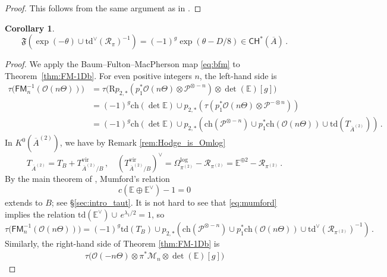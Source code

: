 \documentclass[11pt]{article}
\def\Mc{\mathcal{M}}
\def\CH{\mathsf{CH}}
\def\CO{\mathcal{O}}
\def\P{\mathcal{P}}
\def\EE{\mathbb{E}}
\def\vir{\mathrm{vir}}
\def\ch{\mathrm{ch}}
\def\Td{\mathrm{td}}
\def\fm{\mathfrak{F}}
\def\cR{\mathcal{R}}
\def\FM{\mathsf{FM}}
\renewcommand{\log}{\mathrm{log}}
\newcommand{\barA}{\overline{A}}
\theoremstyle{definition}
\newtheorem{corollary}[definition]{Corollary}
\begin{document}
\begin{proof}
    This follows from the same argument as in \cite[\S 4]{BMP}.
\end{proof}

\begin{corollary}\label{cor:F(exp_theta)}
    \begin{equation}\label{eq:Ftheta}
        \fm(\exp(-\theta) \cup \Td^\vee(\cR_\pi)^{-1}) = (-1)^g\exp(\theta- D/8)\in \CH^{\ast}(\barA)\,.
    \end{equation}
\end{corollary}

\begin{proof}
    We apply the Baum--Fulton--MacPherson map \eqref{eq:bfm} to Theorem~\ref{thm:FM-1Db}. For even positive integers $n$, the left-hand side is
    \begin{align*}
    \tau\big(\FM^{-1}_n(\CO(n\Theta))\big)
    &= \tau\big(\mathrm{R}p_{2,*}(p_1^*\CO(n\Theta) \otimes \P^{\otimes -n})\otimes \det(\mathbb E)[g]\big) \\
    &= (-1)^g\ch(\det\mathbb E) \cup p_{2,*}\!\left(\tau(p_1^*\CO(n\Theta) \otimes \P^{-\otimes n})\right) \\
    &= (-1)^g\ch (\det \mathbb E)\cup p_{2,*}\!\left(\ch(\P^{\otimes- n})\cup p_1^*\ch(\CO(n\Theta))\cup \Td(T_{\barA^{(2)}})\right)\,.
    \end{align*}
    In $K^0(\barA^{(2)})$, we have by Remark \ref{rem:Hodge_is_Omlog}
    $$
    T_{\barA^{(2)}} = T_B + T_{\barA^{(2)}/B}^{\vir}\, ,\quad (T^{\vir}_{\barA^{(2)}/B})^\vee = \Omega_{\pi^{(2)}}^{\log} - \cR_{\pi^{(2)}} = \mathbb E^{\oplus 2} - \cR_{\pi^{(2)}}\, .
    $$
	By the main theorem of \cite{EV04}, Mumford's relation
    \begin{equation}\label{eq:mumford}
        c(\EE \oplus \EE^\vee)-1=0
    \end{equation}
    extends to $B$; see \S\ref{sec:intro_taut}.
    It is not hard to see that \eqref{eq:mumford} implies the relation $\Td(\EE^\vee)\cup \,e^{\lambda_1/2} = 1$, so
    \begin{equation}\label{eq:simplifytau}
    \tau\big(\FM_n^{-1}(\mathcal O(n\Theta))\big) = (-1)^g\Td(T_B) \cup p_{2,*}\!\left(\ch(\P^{\otimes- n})\cup p_1^*\ch(\CO(n\Theta))\cup \Td^\vee(\cR_{\pi^{(2)}})^{-1}\right)\,.
    \end{equation}
    Similarly, the right-hand side of Theorem \ref{thm:FM-1Db} is
    \begin{align*}
    \tau\big(\CO(-n\Theta) \otimes \pi^*\Mc_n\otimes \det (\mathbb E)[g]\big)

\end{align*}
\end{proof}
\end{document}

